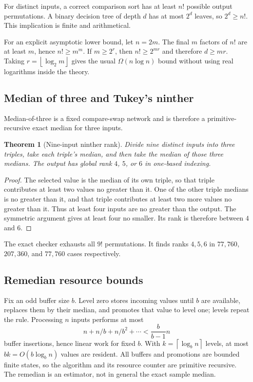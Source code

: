 \documentclass[11pt]{article}
\newtheorem{theorem}{Theorem}[section]
\newcommand{\floor}[1]{\left\lfloor#1\right\rfloor}
\newcommand{\ceil}[1]{\left\lceil#1\right\rceil}
\begin{document}
For distinct inputs, a correct comparison sort has at least $n!$ possible
output permutations.  A binary decision tree of depth $d$ has at most $2^d$
leaves, so $2^d\geq n!$.  This implication is finite and arithmetical.

For an explicit asymptotic lower bound, let $n=2m$.  The final $m$ factors of
$n!$ are at least $m$, hence $n!\geq m^m$.  If $m\geq2^r$, then
$n!\geq2^{mr}$ and therefore $d\geq mr$.  Taking
$r=\floor{\log_2m}$ gives the usual $\Omega(n\log n)$ bound without using real
logarithms inside the theory.

\subsection{Median of three and Tukey's ninther}

Median-of-three is a fixed compare-swap network and is therefore a
primitive-recursive exact median for three inputs.

\begin{theorem}[Nine-input ninther rank]\label{thm:ninther}
Divide nine distinct inputs into three triples, take each triple's median, and
then take the median of those three medians.  The output has global rank $4$,
$5$, or $6$ in one-based indexing.
\end{theorem}

\begin{proof}
The selected value is the median of its own triple, so that triple contributes
at least two values no greater than it.  One of the other triple medians is no
greater than it, and that triple contributes at least two more values no
greater than it.  Thus at least four inputs are no greater than the output.
The symmetric argument gives at least four no smaller.  Its rank is therefore
between $4$ and $6$.
\end{proof}

The exact checker exhausts all $9!$ permutations.  It finds ranks $4,5,6$ in
$77{,}760$, $207{,}360$, and $77{,}760$ cases respectively.

\subsection{Remedian resource bounds}

Fix an odd buffer size $b$.  Level zero stores incoming values until $b$ are
available, replaces them by their median, and promotes that value to level
one; levels repeat the rule.  Processing $n$ inputs performs at most
\[
 n+n/b+n/b^2+\cdots < \frac{b}{b-1}n
\]
buffer insertions, hence linear work for fixed $b$.  With
$k=\ceil{\log_b n}$ levels, at most $bk=O(b\log_b n)$ values are resident.
All buffers and promotions are bounded finite states, so the algorithm and its
resource counter are primitive recursive.  The remedian is an estimator, not
in general the exact sample median.
\end{document}
